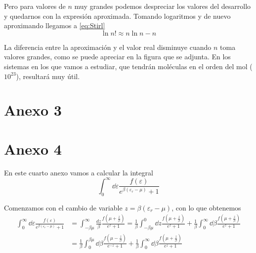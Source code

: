 Pero para valores de $n$ muy grandes podemos despreciar los valores del desarrollo y quedarnos con la expresión aproximada.
Tomando logaritmos y de nuevo aproximando llegamos a \eqref{eq:Stirl}
\begin{equation}
	\ln n! \approx n\ln n - n
\end{equation}

La diferencia entre la aproximación y el valor real disminuye cuando $n$ toma valores grandes, como se puede apreciar en la figura que se adjunta.
En los sistemas en los que vamos a estudiar, que tendrán moléculas en el orden del mol ($10^{23}$), resultará muy útil.

\newpage
\section*{Anexo 3}\label{Anx3}
\renewcommand{\theequation}{A\textsubscript{3}.\arabic{equation}}
\setcounter{equation}{0}


\newpage
\section*{Anexo 4}\label{Anx4}
\renewcommand{\theequation}{A\textsubscript{4}.\arabic{equation}}
\setcounter{equation}{0}

En este cuarto anexo vamos a calcular la integral
\begin{equation}
	\int_{0}^{\infty} \dd{\varepsilon} \frac{f(\varepsilon)}{e^{\beta(\varepsilon_r - \mu)} + 1}
\end{equation}

Comenzamos con el cambio de variable $z = \beta(\varepsilon_r - \mu)$, con lo que obtenemos
\begin{align}\label{eq:des1}
	\int_{0}^{\infty} \dd{\varepsilon} \frac{f(\varepsilon)}{e^{\beta(\varepsilon_r - \mu)} + 1} &= \int_{-\beta\mu}^{\infty} \frac{dz}{\beta} \frac{f(\mu + \frac{z}{\beta})}{e^z + 1} = \frac{1}{\beta} \int_{-\beta\mu}^{0} \dd{z} \frac{f(\mu + \frac{z}{\beta})}{e^z + 1} + \frac{1}{\beta} \int_{0}^{\infty} \dd{\beta} \frac{f(\mu + \frac{z}{\beta})}{e^z + 1} \nonumber\\
	&= \frac{1}{\beta} \int_{0}^{\beta\mu} \dd{\beta} \frac{f(\mu - \frac{z}{\beta})}{e^{-z} + 1} + \frac{1}{\beta} \int_{0}^{\infty} \dd{\beta} \frac{f(\mu + \frac{z}{\beta})}{e^z + 1}
\end{align}

